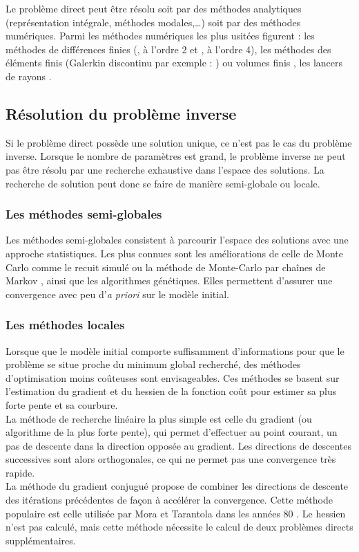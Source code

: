 Le problème direct peut être résolu soit par des méthodes analytiques (représentation intégrale, méthodes modales,\ldots) soit par des méthodes numériques. Parmi les méthodes numériques les plus usitées figurent : les méthodes de différences finies (\citealp{virieux_86}, à l'ordre 2 et \citealp{levander}, à l'ordre 4), les méthodes des éléments finis (Galerkin discontinu par exemple : \citealp{brossier_these}) ou volumes finis \citep{brossier_2008}, les lancers de rayons \citep{virieux_ray}. 

\subsection{Résolution du problème inverse}
Si le problème direct possède une solution unique, ce n'est pas le cas du problème inverse.
Lorsque le nombre de paramètres est grand, le problème inverse ne peut pas être résolu par une recherche exhaustive dans l'espace des solutions. La recherche de solution peut donc se faire de manière semi-globale ou locale.\\

\subsubsection{Les méthodes semi-globales}
Les méthodes semi-globales consistent à parcourir l'espace des solutions avec une approche statistiques. Les plus connues sont les améliorations de celle de Monte Carlo comme le recuit simulé \citep{tarantola_book, sen} ou  la méthode de Monte-Carlo par chaînes de Markov \citep{zhang}, ainsi que les algorithmes génétiques. Elles permettent d'assurer une convergence avec peu d'\emph{a priori} sur le modèle initial.\\

\subsubsection{Les méthodes locales}
Lorsque que le modèle initial comporte suffisamment d'informations pour que le problème se situe proche du minimum global recherché, des méthodes d'optimisation moins coûteuses sont envisageables. Ces méthodes se basent sur l'estimation du gradient et du hessien de la fonction coût pour estimer sa plus forte pente et sa courbure.\\

La méthode de recherche linéaire la plus simple est celle du gradient (ou algorithme de la plus forte pente), qui permet d'effectuer au point courant, un pas de descente dans la direction opposée au gradient. Les directions de descentes successives sont alors orthogonales, ce qui ne permet pas une convergence très rapide. \\
La méthode du gradient conjugué propose de combiner les directions de descente des itérations précédentes de façon à accélérer la convergence. Cette méthode populaire est celle utilisée par Mora et Tarantola dans les années 80 \citep{tarantola_84, mora_87a, mora_87b}. Le hessien n'est pas calculé, mais cette méthode nécessite le calcul de deux problèmes directs supplémentaires. \\

